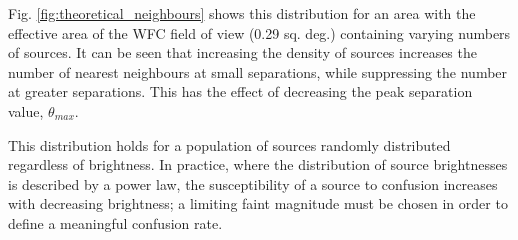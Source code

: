 \documentclass[a4paper,useAMS,usenatbib]{mn2e}
\begin{document}
Fig. \ref{fig:theoretical_neighbours} shows this distribution for an area with the effective area of the WFC field of view (0.29 sq. deg.) containing varying numbers of sources. It can be seen that increasing the density of sources increases the number of nearest neighbours at small separations, while
suppressing the number at greater separations. This has the effect of decreasing the peak separation value, $\theta_{max}$.

This distribution holds for a population of sources randomly distributed regardless of brightness. In practice, where the distribution of source
brightnesses is described by a power law, the susceptibility of a source to
confusion increases with decreasing brightness; a limiting faint magnitude must
be chosen in order to define a meaningful confusion rate.



\end{document}
